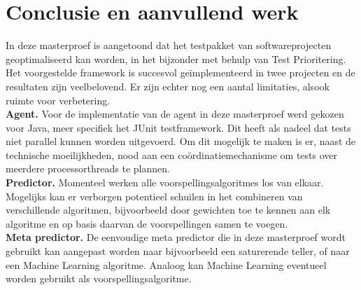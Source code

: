 \section{Conclusie en aanvullend werk}
\noindent In deze masterproef is aangetoond dat het testpakket van softwareprojecten geoptimaliseerd kan worden, in het bijzonder met behulp van Test Prioritering. Het voorgestelde framework is succesvol ge\"implementeerd in twee projecten en de resultaten zijn veelbelovend. Er zijn echter nog een aantal limitaties, alsook ruimte voor verbetering.\\

\noindent \textbf{Agent.}
Voor de implementatie van de agent in deze masterproef werd gekozen voor Java, meer specifiek het JUnit testframework. Dit heeft als nadeel dat tests niet parallel kunnen worden uitgevoerd. Om dit mogelijk te maken is er, naast de technische moeilijkheden, nood aan een co\"ordinatiemechanisme om tests over meerdere processorthreads te plannen.\\

\noindent \textbf{Predictor.}
Momenteel werken alle voorspellingsalgoritmes los van elkaar. Mogelijks kan er verborgen potentieel schuilen in het combineren van verschillende algoritmen, bijvoorbeeld door gewichten toe te kennen aan elk algoritme en op basis daarvan de voorspellingen samen te voegen.\\

\noindent \textbf{Meta predictor.}
De eenvoudige meta predictor die in deze masterproef wordt gebruikt kan aangepast worden naar bijvoorbeeld een saturerende teller, of naar een Machine Learning algoritme. Analoog kan Machine Learning eventueel worden gebruikt als voorspellingsalgoritme.